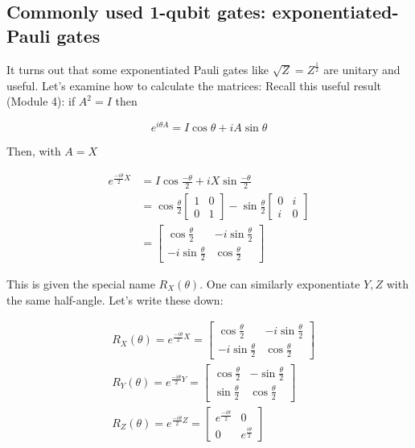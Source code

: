 \documentclass[main.tex]{subfiles}
\begin{document}
\subsection{Commonly used 1-qubit gates: exponentiated-Pauli gates}

    It turns out that some exponentiated Pauli gates like $\sqrt{Z}=Z^{\frac{1}{2}}$ are unitary and useful. Let's examine how to calculate the matrices: Recall this useful result (Module 4): if $A^{2}=I$ then
    
    $$
    e^{i \theta A}=I \cos \theta+i A \sin \theta
    $$
    
    Then, with $A=X$
    
    $$
    \begin{aligned}
    e^{\frac{-i \theta}{2} X} &=I \cos \frac{-\theta}{2}+i X \sin \frac{-\theta}{2} \\
    &=\cos \frac{\theta}{2}\left[\begin{array}{ll}
    1 & 0 \\
    0 & 1
    \end{array}\right]-\sin \frac{\theta}{2}\left[\begin{array}{ll}
    0 & i \\
    i & 0
    \end{array}\right] \\
    &=\left[\begin{array}{cc}
    \cos \frac{\theta}{2} & -i \sin \frac{\theta}{2} \\
    -i \sin \frac{\theta}{2} & \cos \frac{\theta}{2}
    \end{array}\right]
    \end{aligned}
    $$
    
    This is given the special name $R_{X}(\theta)$. One can similarly exponentiate $Y, Z$ with the same half-angle. Let's write these down:
    
    $$
    \begin{aligned}
    &R_{X}(\theta)=e^{\frac{-i \theta}{2} X}=\left[\begin{array}{cc}
    \cos \frac{\theta}{2} & -i \sin \frac{\theta}{2} \\
    -i \sin \frac{\theta}{2} & \cos \frac{\theta}{2}
    \end{array}\right] \\
    &R_{Y}(\theta)=e^{\frac{-i \theta}{2} Y}=\left[\begin{array}{cc}
    \cos \frac{\theta}{2} & -\sin \frac{\theta}{2} \\
    \sin \frac{\theta}{2} & \cos \frac{\theta}{2}
    \end{array}\right] \\
    &R_{Z}(\theta)=e^{\frac{-i \theta}{2} Z}=\left[\begin{array}{cc}
    e^{\frac{-i \theta}{2}} & 0 \\
    0 & e^{\frac{i \theta}{2}}
    \end{array}\right]
    \end{aligned}
    $$
    
\end{document}

